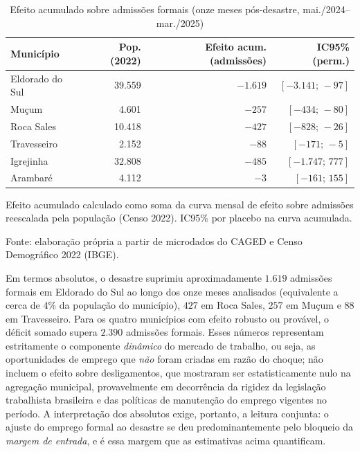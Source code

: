 \documentclass[a4paper,12pt]{article}
\begin{document}
\begin{table}[htbp]
\centering
\caption{Efeito acumulado sobre admissões formais (onze meses pós-desastre, mai./2024–mar./2025)}
\label{tab:acumulado}
\begin{threeparttable}
\small
\begin{tabular}{l r r r}
\toprule
Município & Pop. (2022) & Efeito acum. (admissões) & IC95\% (perm.) \\
\midrule
Eldorado do Sul & 39.559 & $-1.619$ & $[-3.141;\,-97]$ \\
Mu\c{c}um        & 4.601  & $-257$   & $[-434;\,-80]$ \\
Roca Sales      & 10.418 & $-427$   & $[-828;\,-26]$ \\
Travesseiro     & 2.152  & $-88$    & $[-171;\,-5]$ \\
Igrejinha       & 32.808 & $-485$   & $[-1.747;\,777]$ \\
Arambaré        & 4.112  & $-3$     & $[-161;\,155]$ \\
\bottomrule
\end{tabular}
\begin{tablenotes}[flushleft]
\footnotesize
\item Efeito acumulado calculado como soma da curva mensal de efeito sobre admissões reescalada pela população (Censo 2022). IC95\% por placebo na curva acumulada.
\item Fonte: elaboração própria a partir de microdados do CAGED e Censo Demográfico 2022 (IBGE).
\end{tablenotes}
\end{threeparttable}
\end{table}

Em termos absolutos, o desastre suprimiu aproximadamente $1.619$ admissões
formais em Eldorado do Sul ao longo dos onze meses analisados (equivalente
a cerca de $4\%$ da população do município), $427$ em Roca Sales, $257$ em
Mu\c{c}um e $88$ em Travesseiro. Para os quatro municípios com efeito robusto
ou provável, o déficit somado supera $2.390$ admissões formais. Esses
números representam estritamente o componente \emph{dinâmico} do mercado de
trabalho, ou seja, as oportunidades de emprego que \emph{não} foram criadas em
razão do choque; não incluem o efeito sobre desligamentos, que
 mostraram ser estatisticamente nulo na agregação
municipal, provavelmente em decorrência da rigidez da legislação trabalhista
brasileira e das políticas de manutenção do emprego vigentes no período.
A interpretação dos absolutos exige, portanto, a leitura conjunta: o ajuste
do emprego formal ao desastre se deu predominantemente pelo bloqueio da
\emph{margem de entrada}, e é essa margem que as estimativas acima
quantificam.
\end{document}
